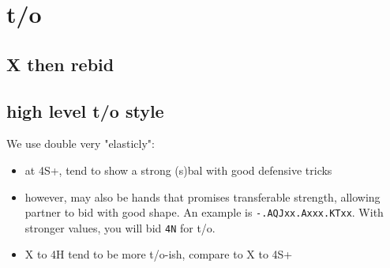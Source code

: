 \section{t/o}


\subsection{X then rebid}


\subsection{high level t/o style}

We use double very "elasticly":

\begin{itemize}
    \setlength\itemsep{0pt}
    \item at 4S+, tend to show a strong (s)bal with good defensive tricks
    \item however, may also be hands that promises transferable strength, allowing partner to bid with good shape. An example is \texttt{-.AQJxx.Axxx.KTxx}. With stronger values, you will bid \texttt{4N} for t/o.
    \item X to 4H tend to be more t/o-ish, compare to X to 4S+
\end{itemize}
